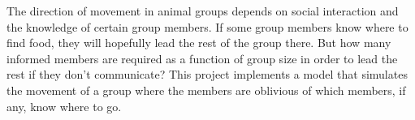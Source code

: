 The direction of movement in animal groups depends on social interaction and the knowledge of certain group members. 
If some group members know where to find food, they will hopefully lead the rest of the group there. 
But how many informed members are required as a function of group size in order to lead the rest if they don't communicate? 
This project implements a model that simulates the movement of a group where the members are oblivious of which members, if any, know where to go.